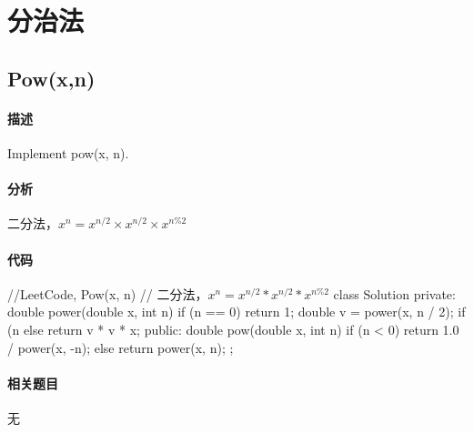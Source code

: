 \chapter{分治法}


\section{Pow(x,n)} %


\subsubsection{描述}
Implement pow(x, n).


\subsubsection{分析}
二分法，$x^n = x^{n/2} \times x^{n/2} \times x^{n\%2}$


\subsubsection{代码}
\begin{Code}
//LeetCode, Pow(x, n)
// 二分法，$x^n = x^{n/2} * x^{n/2} * x^{n\%2}$
class Solution {
private:
    double power(double x, int n) {
        if (n == 0) return 1;
        double v = power(x, n / 2);
        if (n %
        else return v * v * x;
    }
public:
    double pow(double x, int n) {
        if (n < 0) return 1.0 / power(x, -n);
        else return power(x, n);
    }
};
\end{Code}


\subsubsection{相关题目}

\begindot
\item 无
\myenddot
